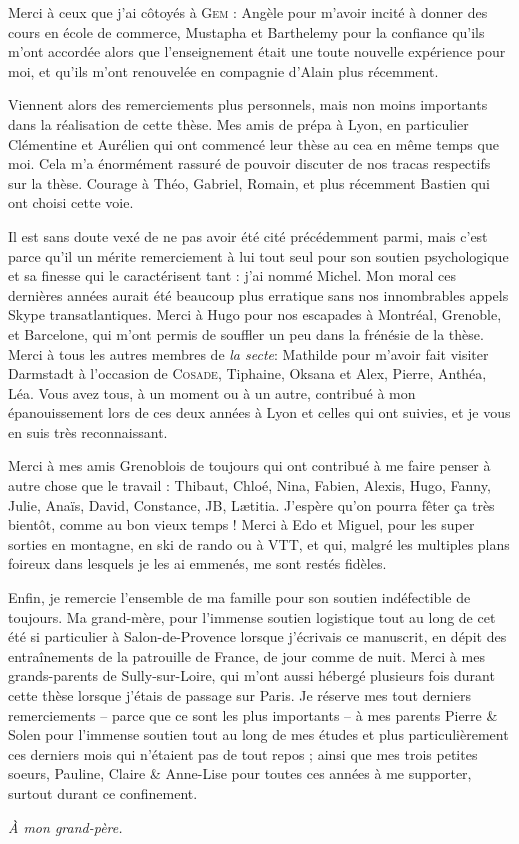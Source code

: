 Merci à ceux que j'ai côtoyés à \textsc{Gem} : Angèle pour m'avoir incité à donner des cours en école de commerce, Mustapha et Barthelemy pour la confiance qu'ils m'ont accordée alors que l'enseignement était une toute nouvelle expérience pour moi, et qu'ils m'ont renouvelée en compagnie d'Alain plus récemment.



Viennent alors des remerciements plus personnels, mais non moins importants dans la réalisation de cette thèse.
Mes amis de prépa à Lyon, en particulier Clémentine et Aurélien qui ont commencé leur thèse au \acrshort{cea} en même temps que moi.
Cela m'a énormément rassuré de pouvoir discuter de nos tracas respectifs sur la thèse.
Courage à Théo, Gabriel, Romain, et plus récemment Bastien qui ont choisi cette voie.

Il est sans doute vexé de ne pas avoir été cité précédemment parmi, mais c'est parce qu'il un mérite remerciement à lui tout seul pour son soutien psychologique et sa finesse qui le caractérisent tant : j'ai nommé Michel.
Mon moral ces dernières années aurait été beaucoup plus erratique sans nos innombrables appels Skype transatlantiques.
Merci à Hugo pour nos escapades à Montréal, Grenoble, et Barcelone, qui m'ont permis de souffler un peu dans la frénésie de la thèse.
Merci à tous les autres membres de \emph{la secte}: Mathilde pour m'avoir fait visiter Darmstadt à l'occasion de \textsc{Cosade}, Tiphaine, Oksana et Alex, Pierre, Anthéa, Léa.
Vous avez tous, à un moment ou à un autre, contribué à mon épanouissement lors de ces deux années à Lyon et celles qui ont suivies, et je vous en suis très reconnaissant.

Merci à mes amis Grenoblois de toujours qui ont contribué à me faire penser à autre chose que le travail : Thibaut, Chloé, Nina, Fabien, Alexis, Hugo, Fanny, Julie, Anaïs, David, Constance, JB, Lætitia.
J'espère qu'on pourra fêter ça très bientôt, comme au bon vieux temps !
Merci à Edo et Miguel, pour les super sorties en montagne, en ski de rando ou à VTT, et qui, malgré les multiples plans foireux dans lesquels je les ai emmenés, me sont restés fidèles.

Enfin, je remercie l'ensemble de ma famille pour son soutien indéfectible de toujours.
Ma grand-mère, pour l'immense soutien logistique tout au long de cet été si particulier à Salon-de-Provence lorsque j'écrivais ce manuscrit, en dépit des entraînements de la patrouille de France, de jour comme de nuit.
Merci à mes grands-parents de Sully-sur-Loire, qui m'ont aussi hébergé plusieurs fois durant cette thèse lorsque j'étais de passage sur Paris.
Je réserve mes tout derniers remerciements -- parce que ce sont les plus importants -- à mes parents Pierre \& Solen pour l'immense soutien tout au long de mes études et plus particulièrement ces derniers mois qui n'étaient pas de tout repos ; ainsi que mes trois petites soeurs, Pauline, Claire \& Anne-Lise pour toutes ces années à me supporter, surtout durant ce confinement.

\epigraph{\textit{À mon grand-père.}}{}
